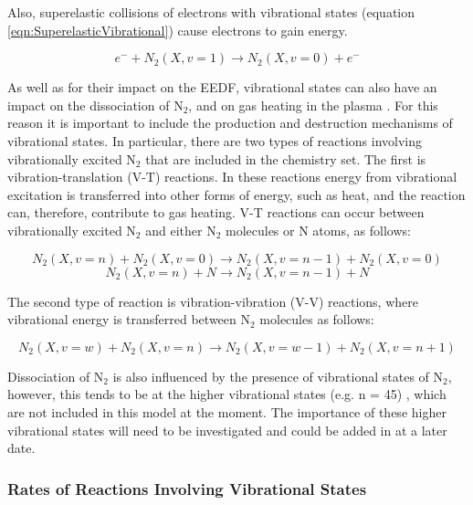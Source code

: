 \documentclass[11pt, oneside]{article}   	%
\begin{document}
Also, superelastic collisions of electrons with vibrational states (equation \ref{eqn:SuperelasticVibrational}) cause electrons to gain energy.

\begin{equation}
e^- + N_2(X,v=1) \rightarrow N_2(X,v=0) + e^-
\label{eqn:SuperelasticVibrational}
\end{equation}

As well as for their impact on the EEDF, vibrational states can also have an impact on the dissociation of N$_2$, and on gas heating in the plasma \cite{Guerra2004kinetic}.
For this reason it is important to include the production and destruction mechanisms of vibrational states.
In particular, there are two types of reactions involving vibrationally excited N$_2$ that are included in the chemistry set.
The first is vibration-translation (V-T) reactions. In these reactions energy from vibrational excitation is transferred into other forms of energy, such as heat, and the reaction can, therefore, contribute to gas heating.
V-T reactions can occur between vibrationally excited N$_2$ and either N$_2$ molecules or N atoms, as follows:

\begin{equation}
N_2(X,v=n) + N_2 (X,v=0) \rightarrow N_2(X,v=n-1) + N_2(X,v=0)
\label{eqn:V-TN2}
\end{equation}
\begin{equation}
N_2(X,v=n) + N \rightarrow N_2(X,v=n-1) + N
\label{eqn:V-TN}
\end{equation}

The second type of reaction is vibration-vibration (V-V) reactions, where vibrational energy is transferred between N$_2$ molecules as follows:

\begin{equation}
N_2(X,v=w) + N_2 (X,v=n) \rightarrow N_2(X,v=w-1) + N_2(X,v=n+1)
\label{eqn:V-V}
\end{equation}

Dissociation of N$_2$ is also influenced by the presence of vibrational states of N$_2$, however, this tends to be at the higher vibrational states (e.g. n = 45) \cite{Guerra2004kinetic}, which are not included in this model at the moment. 
The importance of these higher vibrational states will need to be investigated and could be added in at a later date.


\subsubsection{Rates of Reactions Involving Vibrational States}
\end{document}
